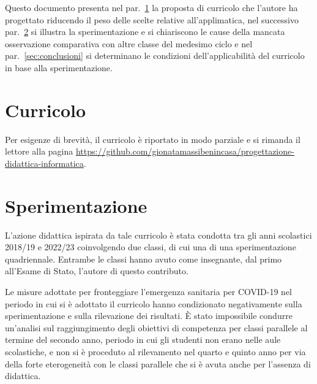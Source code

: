 \documentclass[a4paper]{easychair}
\begin{document}


Questo documento presenta nel par.~\ref{sec:curricolo} la proposta di curricolo
che l'autore ha progettato riducendo il peso delle scelte relative all'applimatica,
nel successivo par.~\ref{sec:sperimentazione} si illustra la sperimentazione e si
chiariscono le cause della mancata osservazione comparativa con altre classe del medesimo ciclo e
nel par.~\ref{sec:conclusioni} si determinano le condizioni dell'applicabilità del curricolo in base
alla sperimentazione.


\section[Curricolo]{Curricolo}
\label{sec:curricolo}

Per esigenze di brevità, il curricolo è riportato in modo parziale e si rimanda il lettore alla pagina \url{https://github.com/gionatamassibenincasa/progettazione-didattica-informatica}.



\section{Sperimentazione}
\label{sec:sperimentazione}

L'azione didattica ispirata da tale curricolo è stata condotta tra gli anni scolastici
2018/19 e 2022/23 coinvolgendo due classi, di cui una di una sperimentazione quadriennale.
Entrambe le classi hanno avuto come insegnante, dal primo all'Esame di Stato,
l'autore di questo contributo.

Le misure adottate per fronteggiare l'emergenza sanitaria per COVID-19 nel periodo in cui
si è adottato il curricolo hanno condizionato negativamente sulla sperimentazione e sulla
rilevazione dei risultati.
È stato impossibile condurre un'analisi sul raggiungimento degli obiettivi di competenza per classi
parallele al termine del secondo anno, periodo in cui gli studenti non erano nelle aule scolastiche,
e non si è proceduto al rilevamento nel quarto e quinto anno per via della forte eterogeneità con le
classi parallele che si è avuta anche per l'assenza di didattica.
\end{document}
